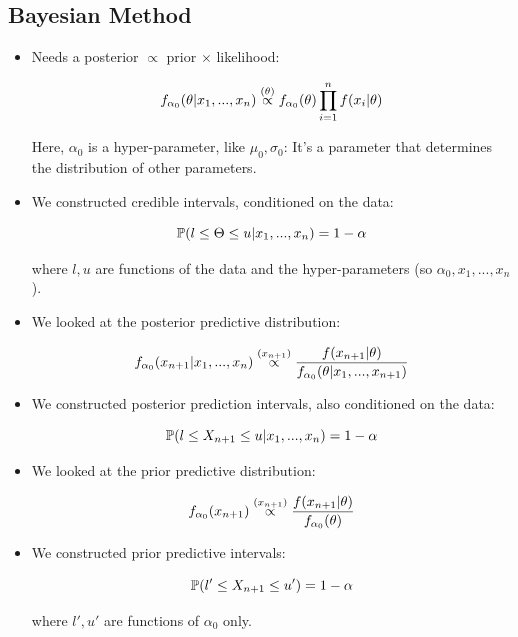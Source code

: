 \documentclass[a4paper]{article}
\begin{document}
        \subsection*{Bayesian Method}
            \begin{itemize}
                \item Needs a posterior $\propto$ prior $\times$ likelihood:

                    $$
                        f_{\alpha_0}(\theta | x_1, ..., x_n) \stackrel{({\theta})}{\propto}
                        f_{\alpha_0}(\theta) \prod_{i=1}^n f(x_i | \theta)
                    $$

                    Here, $\alpha_0$ is a hyper-parameter, like $\mu_0,
                    \sigma_0$: It's a parameter that determines the distribution
                    of other parameters.

                \item We constructed credible intervals, conditioned on the
                    data:

                    $$
                        \mathbb{P}(l \leq \Theta \leq u | x_1, ..., x_n) = 1 -
                        \alpha
                    $$

                    where $l, u$ are functions of the data and the
                    hyper-parameters (so $\alpha_0, x_1, ..., x_n$).

                \item We looked at the posterior predictive distribution:

                    $$
                        f_{\alpha_0}(x_{n+1} | x_1, ..., x_n) \stackrel{({x_{n+1}})}{\propto}
                        \frac{f(x_{n+1}| \theta)}{f_{\alpha_0}(\theta | x_1,
                        ..., x_{n+1})}
                    $$

                \item We constructed posterior prediction intervals, also
                    conditioned on the data:

                    $$
                        \mathbb{P}(l \leq X_{n+1} \leq u | x_1, ..., x_n) = 1 -
                        \alpha
                    $$

                \item We looked at the prior predictive distribution:

                    $$
                        f_{\alpha_0}(x_{n+1}) \stackrel{({x_{n+1}})}{\propto} \frac{f(x_{n+1}
                        | \theta)}{f_{\alpha_0}(\theta)}
                    $$

                \item We constructed prior predictive intervals:

                    $$
                        \mathbb{P}(l' \leq X_{n+1} \leq u') = 1 - \alpha
                    $$

                    where $l', u'$ are functions of $\alpha_0$ only.
            \end{itemize}
\end{document}
